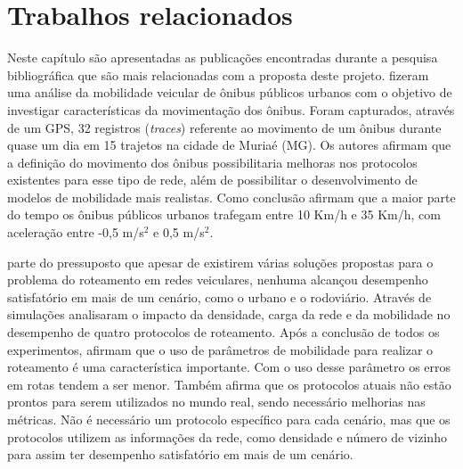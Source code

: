 \documentclass[mestrado, pre-defesa, english, brazil]{packages/icmc}
\begin{document}
\chapter{Trabalhos relacionados} \label{trab. rela.}

Neste capítulo são apresentadas as publicações encontradas durante a pesquisa bibliográfica que são mais relacionadas com a proposta deste projeto.  fizeram uma análise da mobilidade veicular de ônibus públicos urbanos com o objetivo de investigar características da movimentação dos ônibus. Foram capturados, através de um GPS, 32 registros (\textit{traces}) referente ao movimento de um ônibus durante quase um dia em 15 trajetos na cidade de Muriaé (MG). Os autores afirmam que a definição do movimento dos ônibus possibilitaria melhoras nos protocolos existentes para esse tipo de rede, além de possibilitar o desenvolvimento de modelos de mobilidade mais realistas. Como conclusão afirmam que a maior parte do tempo os ônibus públicos urbanos trafegam entre 10 Km/h e 35 Km/h, com aceleração entre -0,5 m/s$^{2}$ e 0,5 m/s$^{2}$.

 parte do pressuposto que apesar de existirem várias soluções propostas para o problema do roteamento em redes veiculares, nenhuma alcançou desempenho satisfatório em mais de um cenário, como o urbano e o rodoviário. Através de simulações analisaram o impacto da densidade, carga da rede e da mobilidade no desempenho de quatro protocolos de roteamento. Após a conclusão de todos os experimentos, afirmam que o uso de parâmetros de mobilidade para realizar o roteamento é uma característica importante. Com o uso desse parâmetro os erros em rotas tendem a ser menor. Também afirma que os protocolos atuais não estão prontos para serem utilizados no mundo real, sendo necessário melhorias nas métricas. Não é necessário um protocolo específico para cada cenário, mas que os protocolos utilizem as informações da rede, como densidade e número de vizinho para assim ter desempenho satisfatório em mais de um cenário.
\end{document}
